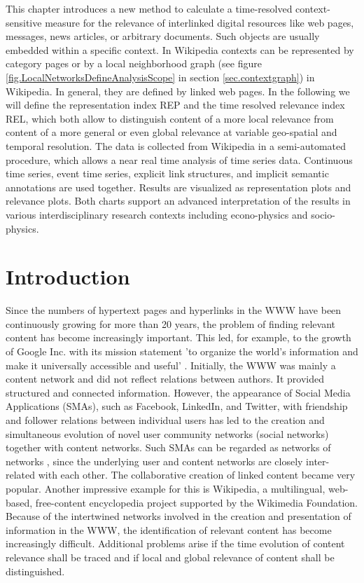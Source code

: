 \documentclass[a4paper,10pt]{scrbook}
\begin{document}
This chapter introduces a new method to calculate a time-resolved context-sensitive
measure for the relevance of interlinked digital resources like web pages, messages, news articles, or arbitrary documents. Such objects are usually embedded within a specific context. In Wikipedia contexts can be represented 
by category pages or by a local neighborhood graph (see figure \ref{fig.LocalNetworksDefineAnalysisScope} in section \ref{sec.contextgraph}) in Wikipedia. In general, they are defined by linked web pages. In the following we will define the representation index REP and the time resolved relevance
index REL, which both allow to distinguish content of a more local relevance from content
of a more general or even global relevance at
variable geo-spatial and temporal resolution. The data is collected from
Wikipedia in a semi-automated procedure, which allows a near real time
analysis of time series data. Continuous time series, event time series, explicit link structures, 
and implicit semantic annotations are used together.
Results are visualized as representation plots and relevance plots. Both charts
support an advanced interpretation of the results in various interdisciplinary
research contexts including econo-physics and socio-physics.

\section{Introduction}

\cite{Berberich2004} 

Since the numbers of hypertext pages and hyperlinks in the WWW
have been continuously growing for more than 20 years, the problem of finding
relevant content has become increasingly important. This led, for example, to
the growth of Google Inc. with its mission statement 'to organize the world's
information and make it universally accessible and useful' \cite{GoogleMission}.
Initially, the WWW was mainly a content network and did not reflect relations
between authors. It provided structured and connected information. However, the
appearance of Social Media Applications (SMAs), such as Facebook, LinkedIn, and
Twitter, with friendship and follower relations between individual users has led
to the creation and simultaneous evolution of novel user community networks
(social networks) together with content networks. Such SMAs can be regarded as
networks of networks \cite{Bakshy:2012:RSN:2187836.2187907}, since the
underlying user and content networks are closely inter-related with each other.
The collaborative creation of linked content became very popular. Another
impressive example for this is Wikipedia, a multilingual, web-based,
free-content encyclopedia project supported by the Wikimedia Foundation. Because of the
intertwined networks involved in the creation and presentation of information in
the WWW, the identification of relevant content has become increasingly
difficult. Additional problems arise if the time evolution of content relevance
shall be traced and if local and global relevance of content shall be
distinguished.
\end{document}
